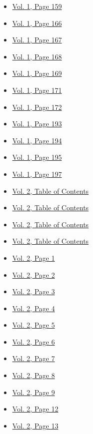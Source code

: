 \begin{itemize}
\begin{itemize}
  \item
    \protect\hyperlink{g-page-167}{Vol. 1, Page 159}
  \item
    \protect\hyperlink{g-page-174}{Vol. 1, Page 166}
  \item
    \protect\hyperlink{g-page-175}{Vol. 1, Page 167}
  \item
    \protect\hyperlink{g-page-176}{Vol. 1, Page 168}
  \item
    \protect\hyperlink{g-page-177}{Vol. 1, Page 169}
  \item
    \protect\hyperlink{g-page-179}{Vol. 1, Page 171}
  \item
    \protect\hyperlink{g-page-180}{Vol. 1, Page 172}
  \item
    \protect\hyperlink{g-page-201}{Vol. 1, Page 193}
  \item
    \protect\hyperlink{g-page-202}{Vol. 1, Page 194}
  \item
    \protect\hyperlink{g-page-203}{Vol. 1, Page 195}
  \item
    \protect\hyperlink{g-page-205}{Vol. 1, Page 197}
  \item
    \protect\hyperlink{g-page-209}{Vol. 2, Table of Contents}
  \item
    \protect\hyperlink{g-page-210}{Vol. 2, Table of Contents}
  \item
    \protect\hyperlink{g-page-211}{Vol. 2, Table of Contents}
  \item
    \protect\hyperlink{g-page-212}{Vol. 2, Table of Contents}
  \item
    \protect\hyperlink{g-page-213}{Vol. 2, Page 1}
  \item
    \protect\hyperlink{g-page-214}{Vol. 2, Page 2}
  \item
    \protect\hyperlink{g-page-215}{Vol. 2, Page 3}
  \item
    \protect\hyperlink{g-page-216}{Vol. 2, Page 4}
  \item
    \protect\hyperlink{g-page-217}{Vol. 2, Page 5}
  \item
    \protect\hyperlink{g-page-218}{Vol. 2, Page 6}
  \item
    \protect\hyperlink{g-page-219}{Vol. 2, Page 7}
  \item
    \protect\hyperlink{g-page-220}{Vol. 2, Page 8}
  \item
    \protect\hyperlink{g-page-221}{Vol. 2, Page 9}
  \item
    \protect\hyperlink{g-page-224}{Vol. 2, Page 12}
  \item
    \protect\hyperlink{g-page-225}{Vol. 2, Page 13}

\end{itemize}
\end{itemize}

